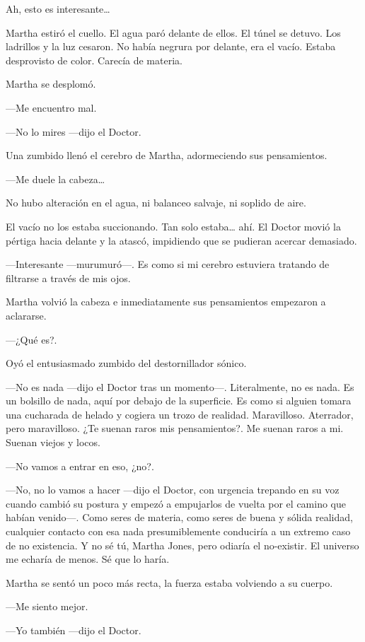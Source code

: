 Ah, esto es interesante\ldots{}

Martha estiró el cuello. El agua paró delante de ellos. El túnel se detuvo. Los ladrillos y la luz cesaron. No había negrura por delante, era el vacío. Estaba desprovisto de color. Carecía de materia.

Martha se desplomó.

---Me encuentro mal.

---No lo mires ---dijo el Doctor.

Una zumbido llenó el cerebro de Martha, adormeciendo sus pensamientos.

---Me duele la cabeza\ldots{}

No hubo alteración en el agua, ni balanceo salvaje, ni soplido de aire.

El vacío no los estaba succionando. Tan solo estaba\ldots{} ahí. El Doctor movió la pértiga hacia delante y la atascó, impidiendo que se pudieran acercar demasiado.

---Interesante ---murumuró---. Es como si mi cerebro estuviera tratando de filtrarse a través de mis ojos.

Martha volvió la cabeza e inmediatamente sus pensamientos empezaron a aclararse.

---¿Qué es?.

Oyó el entusiasmado zumbido del destornillador sónico.

---No es nada ---dijo el Doctor tras un momento---. Literalmente, no es nada. Es un bolsillo de nada, aquí por debajo de la superficie. Es como si alguien tomara una cucharada de helado y cogiera un trozo de realidad. Maravilloso. Aterrador, pero maravilloso. ¿Te suenan raros mis pensamientos?. Me suenan raros a mi. Suenan viejos y locos.

---No vamos a entrar en eso, ¿no?.

---No, no lo vamos a hacer ---dijo el Doctor, con urgencia trepando en su voz cuando cambió su postura y empezó a empujarlos de vuelta por el camino que habían venido---. Como seres de materia, como seres de buena y sólida realidad, cualquier contacto con esa nada presumiblemente conduciría a un extremo caso de no existencia. Y no sé tú, Martha Jones, pero odiaría el no-existir. El universo me echaría de menos. Sé que lo haría.

Martha se sentó un poco más recta, la fuerza estaba volviendo a su cuerpo.

---Me siento mejor.

---Yo también ---dijo el Doctor.


